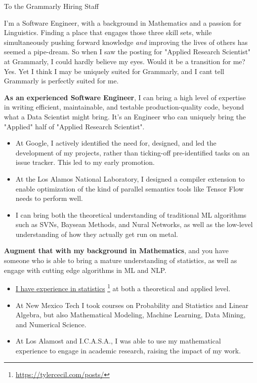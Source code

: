 \documentclass[]{article}
\newcommand{\cvcolor}[1]{{\color{MidnightBlue}#1}}
\newcommand{\hl}[1]{\cvcolor{\textbf{#1}}}
\renewcommand{\cite}[2]{\href{#2}{#1} \footnote{\href{#2}{#2}}}
\begin{document}
\begin{adjustwidth}{30pt}{30pt}

  To the Grammarly Hiring Staff \par \bigskip

  I'm a Software Engineer, with a background in Mathematics and a passion for
  Linguistics. Finding a place that engages those three skill sets, while
  simultaneously pushing forward knowledge \emph{and} improving the lives of
  others has seemed a pipe-dream. So when I saw the posting for "Applied
  Research Scientist" at Grammarly, I could hardly believe my eyes. Would it be
  a transition for me? Yes. Yet I think I may be uniquely suited for Grammarly,
  and I cant tell Grammarly is perfectly suited for me. \medskip

  \hl{As an experienced Software Engineer}, I can bring a high level of
  expertise in writing efficient, maintainable, and testable production-quality
  code, beyond what a Data Scientist might bring. It's an Engineer who can
  uniquely bring the "Applied" half of "Applied Research Scientist".
  \begin{itemize}
    \item At Google, I actively identified the need for, designed, and led the
      development of my projects, rather than ticking-off pre-identified tasks
      on an issue tracker. This led to my early promotion.
    \item At the Los Alamos National Laboratory, I designed a compiler
      extension to enable optimization of the kind of parallel semantics tools
      like Tensor Flow needs to perform well.
    \item I can bring both the theoretical understanding of traditional ML
      algorithms such as SVNs, Baysean Methods, and Nural Networks, as well as
      the low-level understanding of how they actually get run on metal.
  \end{itemize} \medskip

  \hl{Augment that with my background in Mathematics}, and you have someone who
  is able to bring a mature understanding of statistics, as well as engage with
  cutting edge algorithms in ML and NLP.
  \begin{itemize}
    \item \cite{I have experience in statistics}{https://tylercecil.com/posts/}
      at both a theoretical and applied level.
    \item At New Mexico Tech I took courses on Probability and Statistics and
      Linear Algebra, but also Mathematical Modeling, Machine Learning, Data
      Mining, and Numerical Science.
    \item At Los Alamost and I.C.A.S.A., I was able to use my mathematical
      experience to engage in academic research, raising the impact of my work.
  \end{itemize} \medskip


\end{adjustwidth}
\end{document}
